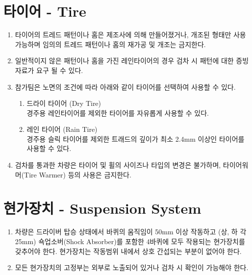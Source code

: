 \documentclass[final,a4paper,10pt]{report}
\begin{document}
\section{타이어 - Tire}\label{rule:formula-technical.tires}
\begin{enumerate}
  \item\label{rule:formula-technical.tires.factory-tread-pattern-only} 타이어의 트레드 패턴이나 홈은 제조사에 의해 만들어졌거나, 개조된 형태만 사용 가능하며 임의의 트레드 패턴이나 홈의 재가공 및 개조는 금지한다.
  \item\label{rule:formula-technical.tires.rain-tire-pattern-evidence} 일반적이지 않은 패턴이나 홈을 가진 레인타이어의 경우 검차 시 패턴에 대한 증빙자료가 요구 될 수 있다.

  \item\label{rule:formula-technical.tires.tire-selection-by-condition} 참가팀은 노면의 조건에 따라 아래와 같이 타이어를 선택하여 사용할 수 있다.
    \begin{enumerate}
      \item\label{rule:formula-technical.tires.tire-selection-by-condition.dry-tire} 드라이 타이어 (Dry Tire)\\
        경주용 레인타이어를 제외한 타이어를 자유롭게 사용할 수 있다.
      \item\label{rule:formula-technical.tires.tire-selection-by-condition.rain-tire-tread-depth} 레인 타이어 (Rain Tire)\\
        경주용 슬릭 타이어를 제외한 트래드의 깊이가 최소 2.4mm 이상인 타이어를 사용할 수 있다.
    \end{enumerate}

  \item\label{rule:formula-technical.tires.tire-lockdown-no-warmer} 검차를 통과한 차량은 타이어 및 휠의 사이즈나 타입의 변경은 불가하며, 타이어워머(Tire Warmer) 등의 사용은 금지한다.
\end{enumerate}

\section{현가장치 - Suspension System}\label{rule:formula-technical.suspension}
\begin{enumerate}
  \item\label{rule:formula-technical.suspension.min-wheel-travel-50mm} 차량은 드라이버 탑승 상태에서 바퀴의 움직임이 50mm 이상 작동하고 (상, 하 각 25mm) 쇽업소버(Shock Absorber)를 포함한 4바퀴에 모두 작용되는 현가장치를 갖추어야 한다. 현가장치는 작동범위 내에서 상호 간섭되는 부분이 없어야 한다.
  \item\label{rule:formula-technical.suspension.mounts-visible-for-inspection} 모든 현가장치의 고정부는 외부로 노출되어 있거나 검차 시 확인이 가능해야 한다.
\end{enumerate}
\end{document}
